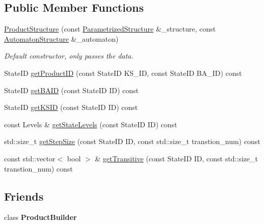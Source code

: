 \subsection*{\-Public \-Member \-Functions}
\begin{DoxyCompactItemize}
\item 
\hypertarget{classProductStructure_a1669ec333c66cc802ba2a5f781e4dd41}{\hyperlink{classProductStructure_a1669ec333c66cc802ba2a5f781e4dd41}{\-Product\-Structure} (const \hyperlink{classParametrizedStructure}{\-Parametrized\-Structure} \&\-\_\-structure, const \hyperlink{classAutomatonStructure}{\-Automaton\-Structure} \&\-\_\-automaton)}\label{classProductStructure_a1669ec333c66cc802ba2a5f781e4dd41}

\begin{DoxyCompactList}\small\item\em \-Default constructor, only passes the data. \end{DoxyCompactList}\item 
\-State\-I\-D \hyperlink{classProductStructure_abc8e244f4cdeaff7bcea7f592a4b2297}{get\-Product\-I\-D} (const \-State\-I\-D \-K\-S\-\_\-\-I\-D, const \-State\-I\-D \-B\-A\-\_\-\-I\-D) const 
\item 
\-State\-I\-D \hyperlink{classProductStructure_ad5c76b37b08e6aac431624c229a83958}{get\-B\-A\-I\-D} (const \-State\-I\-D \-I\-D) const 
\item 
\-State\-I\-D \hyperlink{classProductStructure_a650c655568c984ec1138f91691693a15}{get\-K\-S\-I\-D} (const \-State\-I\-D \-I\-D) const 
\item 
const \-Levels \& \hyperlink{classProductStructure_ae55a35958534cebb974d491ff80fedc1}{get\-State\-Levels} (const \-State\-I\-D \-I\-D) const 
\item 
std\-::size\-\_\-t \hyperlink{classProductStructure_ae6905f6bedffcb40115a9ddd2edb1d5a}{get\-Step\-Size} (const \-State\-I\-D \-I\-D, const std\-::size\-\_\-t transtion\-\_\-num) const 
\item 
const std\-::vector$<$ bool $>$ \& \hyperlink{classProductStructure_a0b4ed666548d34270779222d4ae31606}{get\-Transitive} (const \-State\-I\-D \-I\-D, const std\-::size\-\_\-t transtion\-\_\-num) const 
\end{DoxyCompactItemize}
\subsection*{\-Friends}
\begin{DoxyCompactItemize}
\item 
\hypertarget{classProductStructure_a6c45ddd297f18174168e322ae1b74396}{class {\bfseries \-Product\-Builder}}\label{classProductStructure_a6c45ddd297f18174168e322ae1b74396}

\end{DoxyCompactItemize}


